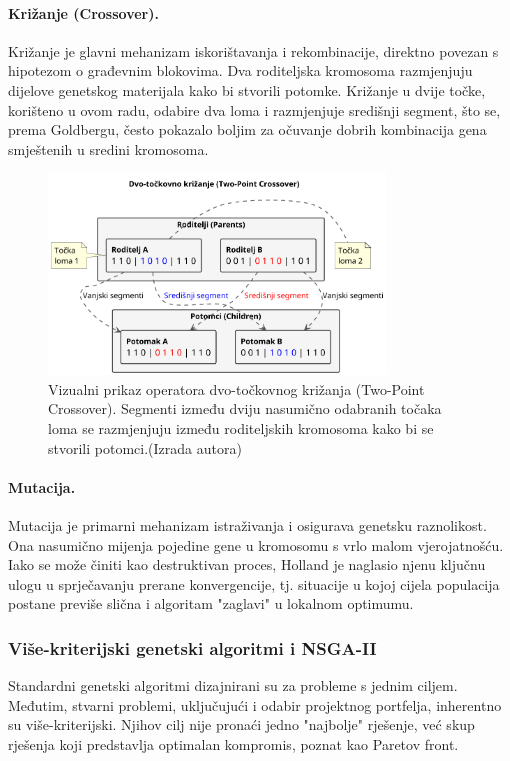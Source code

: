 \paragraph{Križanje (Crossover).} Križanje je glavni mehanizam iskorištavanja i rekombinacije, direktno povezan s hipotezom o građevnim blokovima. Dva roditeljska kromosoma razmjenjuju dijelove genetskog materijala kako bi stvorili potomke. Križanje u dvije točke, korišteno u ovom radu, odabire dva loma i razmjenjuje središnji segment, što se, prema Goldbergu, često pokazalo boljim za očuvanje dobrih kombinacija gena smještenih u sredini kromosoma.
\begin{figure}[H]
    \centering
    \includegraphics[width=0.8\textwidth]{slike/crossover_diagram.png}
    \caption{Vizualni prikaz operatora dvo-točkovnog križanja (Two-Point Crossover). Segmenti između dviju nasumično odabranih točaka loma se razmjenjuju između roditeljskih kromosoma kako bi se stvorili potomci.(Izrada autora)}
    \label{fig:crossover}
\end{figure}
\paragraph{Mutacija.} Mutacija je primarni mehanizam istraživanja i osigurava genetsku raznolikost. Ona nasumično mijenja pojedine gene u kromosomu s vrlo malom vjerojatnošću. Iako se može činiti kao destruktivan proces, Holland \cite{Holland1975} je naglasio njenu ključnu ulogu u sprječavanju prerane konvergencije, tj. situacije u kojoj cijela populacija postane previše slična i algoritam "zaglavi" u lokalnom optimumu.




\subsubsection{Više-kriterijski genetski algoritmi i NSGA-II}
\label{sec:NSGA-II}
Standardni genetski algoritmi dizajnirani su za probleme s jednim ciljem. Međutim, stvarni problemi, uključujući i odabir projektnog portfelja, inherentno su više-kriterijski. Njihov cilj nije pronaći jedno "najbolje" rješenje, već skup rješenja koji predstavlja optimalan kompromis, poznat kao Paretov front.

